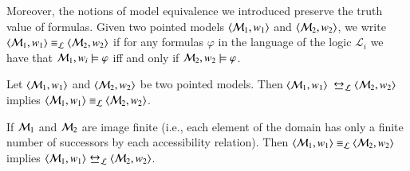 
%
%


Moreover, the notions of model equivalence we introduced preserve
the truth value of formulas. Given two pointed models $\langle \mathcal{M}_1,w_1 \rangle$
and $\langle \mathcal{M}_2,w_2 \rangle$, we write $\langle \mathcal{M}_1,w_1 \rangle \equiv_\mathcal{L} \langle \mathcal{M}_2,w_2 \rangle$ if for any formulas $\varphi$ in the language of the logic
$\mathcal{L}_i$ we have that $\mathcal{M}_1,w_i \models \varphi$ iff and only if
$\mathcal{M}_2,w_2 \models \varphi$.


\begin{thm}\label{bisim}
Let $\langle \mathcal{M}_1, w_1 \rangle$ and $\langle \mathcal{M}_2,w_2 \rangle$ be two pointed
models. Then $\langle \mathcal{M}_1,w_1 \rangle$ $\bisim_\gL \tup{\gM_2,w_2}$ implies
$\langle \mathcal{M}_1,w_1 \rangle \equiv_{\mathcal{L}} \langle \mathcal{M}_2,w_2 \rangle$.

If
$\mathcal{M}_1$ and $\mathcal{M}_2$ are image finite (i.e., each element of the
domain has only a finite number of successors by each accessibility
relation). Then
$\langle \mathcal{M}_1, w_1 \rangle \equiv_{\mathcal{L}} \langle \mathcal{M}_2, w_2 \rangle$ implies
$\tup{\gM_1, w_1} \bisim_\gL \tup{\gM_2, w_2}$.
\end{thm}

